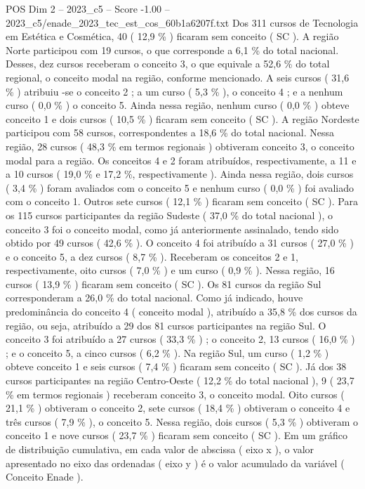 \begin{textsample}{POS Dim 2 – 2023\_c5 – Score -1.00 – 2023\_c5/enade\_2023\_tec\_est\_cos\_60b1a6207f.txt}
Dos 311 cursos de Tecnologia em Estética e Cosmética, 40 ( 12,9 \% ) ficaram sem conceito ( SC ).
A região Norte participou com 19 cursos, o que corresponde a 6,1 \% do total nacional.
Desses, dez cursos receberam o conceito 3, o que equivale a 52,6 \% do total regional, o conceito modal na região, conforme mencionado.
A seis cursos ( 31,6 \% ) atribuiu -se o conceito 2 ; a um curso ( 5,3 \% ), o conceito 4 ; e a nenhum curso ( 0,0 \% ) o conceito 5.
Ainda nessa região, nenhum curso ( 0,0 \% ) obteve conceito 1 e dois cursos ( 10,5 \% ) ficaram sem conceito ( SC ).
A região Nordeste participou com 58 cursos, correspondentes a 18,6 \% do total nacional.
Nessa região, 28 cursos ( 48,3 \% em termos regionais ) obtiveram conceito 3, o conceito modal para a região.
Os conceitos 4 e 2 foram atribuídos, respectivamente, a 11 e a 10 cursos ( 19,0 \% e 17,2 \%, respectivamente ).
Ainda nessa região, dois cursos ( 3,4 \% ) foram avaliados com o conceito 5 e nenhum curso ( 0,0 \% ) foi avaliado com o conceito 1.
Outros sete cursos ( 12,1 \% ) ficaram sem conceito ( SC ).
Para os 115 cursos participantes da região Sudeste ( 37,0 \% do total nacional ), o conceito 3 foi o conceito modal, como já anteriormente assinalado, tendo sido obtido por 49 cursos ( 42,6 \% ).
O conceito 4 foi atribuído a 31 cursos ( 27,0 \% ) e o conceito 5, a dez cursos ( 8,7 \% ).
Receberam os conceitos 2 e 1, respectivamente, oito cursos ( 7,0 \% ) e um curso ( 0,9 \% ).
Nessa região, 16 cursos ( 13,9 \% ) ficaram sem conceito ( SC ).
Os 81 cursos da região Sul corresponderam a 26,0 \% do total nacional.
Como já indicado, houve predominância do conceito 4 ( conceito modal ), atribuído a 35,8 \% dos cursos da região, ou seja, atribuído a 29 dos 81 cursos participantes na região Sul.
O conceito 3 foi atribuído a 27 cursos ( 33,3 \% ) ; o conceito 2, 13 cursos ( 16,0 \% ) ; e o conceito 5, a cinco cursos ( 6,2 \% ).
Na região Sul, um curso ( 1,2 \% ) obteve conceito 1 e seis cursos ( 7,4 \% ) ficaram sem conceito ( SC ).
Já dos 38 cursos participantes na região Centro-Oeste ( 12,2 \% do total nacional ), 9 ( 23,7 \% em termos regionais ) receberam conceito 3, o conceito modal.
Oito cursos ( 21,1 \% ) obtiveram o conceito 2, sete cursos ( 18,4 \% ) obtiveram o conceito 4 e três cursos ( 7,9 \% ), o conceito 5.
Nessa região, dois cursos ( 5,3 \% ) obtiveram o conceito 1 e nove cursos ( 23,7 \% ) ficaram sem conceito ( SC ).
Em um gráfico de distribuição cumulativa, em cada valor de abscissa ( eixo x ), o valor apresentado no eixo das ordenadas ( eixo y ) é o valor acumulado da variável ( Conceito Enade ).

\end{textsample}
